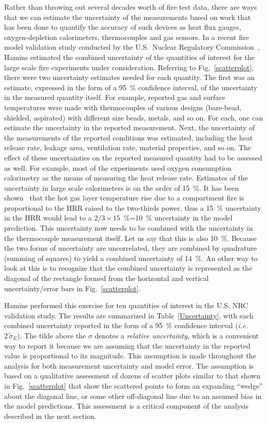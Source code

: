 Rather than throwing out several decades worth of fire test data, there are ways that we can estimate the uncertainty of the measurements based on work
that has been done to quantify the accuracy of such devices as heat flux gauges, oxygen-depletion calorimeters, thermocouples and gas sensors.
In a recent fire model validation study conducted by the U.S.~Nuclear Regulatory Commission~\cite{NUREG_1824}, Hamins estimated the combined
uncertainty of the quantities of interest for the large scale fire experiments under consideration. Referring to Fig.~\ref{scatterplot}, there were
two uncertainty estimates needed for each quantity. The first was an estimate, expressed in the form of a 95~\% confidence interval, of the
uncertainty in the measured quantity itself. For example, reported gas and surface temperatures were made with thermocouples of various designs (bare-bead,
shielded, aspirated) with different size beads, metals, and so on. For each, one can estimate the uncertainty in the reported measurement. Next, the
uncertainty of the measurements of the reported conditions was estimated, including the heat release rate, leakage area, ventilation rate, material
properties, and so on. The effect of these uncertainties on the reported measured quantity had to be assessed as well. For example, most of the
experiments used oxygen consumption calorimetry as the means of measuring the heat release rate.
Estimates of the uncertainty in large scale calorimeters is on the order of 15~\%. It has been shown~\cite{SFPE:Walton} that the hot gas layer temperature rise due to
a compartment fire is proportional to the HRR raised to the two-thirds power, thus a 15~\% uncertainty in the HRR would lead to a $2/3 \times 15$~\%=10~\%
uncertainty in the model prediction. This uncertainty now needs to be combined with the uncertainty in the thermocouple measurement itself. Let us say that
this is also 10~\%. Because the two forms of uncertainty are uncorrelated, they are combined by quadrature (summing of squares) to yield a combined
uncertainty of 14~\%. An other way to look at this is to recognize that the combined uncertainty is represented as the diagonal of the rectangle formed
from the horizontal and vertical uncertainty/error bars in Fig.~\ref{scatterplot}.

Hamins performed this exercise for ten quantities of interest in the U.S. NRC validation study. The results are summarized in Table~\ref{Uncertainty}, with
each combined uncertainty reported in the form of a 95~\% confidence interval ({\em i.e.} $2 \, \widetilde{\sigma}_E$). The tilde above the $\sigma$ denotes a
{\em relative uncertainty}, which is a convenient way to report it because we are assuming that the uncertainty in the reported value is proportional to
its magnitude. This assumption is made throughout the analysis for both measurement uncertainty and model error. The assumption is based on a
qualitative assessment of dozens of scatter plots similar to that shown in Fig.~\ref{scatterplot} that show the scattered points to form an expanding ``wedge''
about the diagonal line, or some other off-diagonal line due to an assumed bias in the model predictions. This assessment is a critical component of the
analysis described in the next section.

